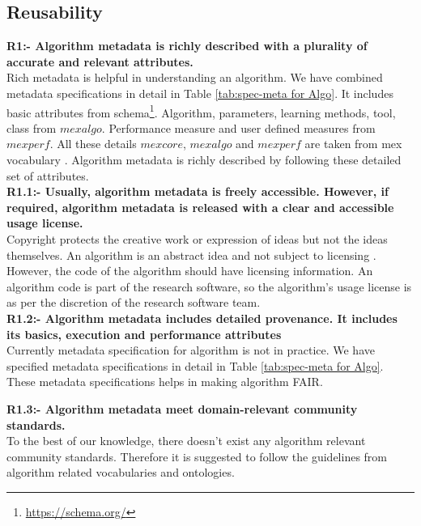 \documentclass[preprint,12pt]{elsarticle}
\begin{document}
\subsection{Reusability}
\textbf{R1:- Algorithm metadata is richly described with a plurality of accurate and relevant attributes.}\\
Rich metadata is helpful in understanding an algorithm. We have combined metadata specifications in detail in Table \ref{tab:spec-meta for Algo}. It includes basic attributes from schema\footnote{\url{https://schema.org/}}. Algorithm, parameters, learning methods, tool, class from $mexalgo$. Performance measure and user defined measures from $mexperf$. All these details $mexcore$, $mexalgo$ and $mexperf$ are taken from mex vocabulary \cite{esteves2015mex}. Algorithm metadata is richly described by following these detailed set of attributes.\\
\textbf{R1.1:- Usually, algorithm metadata is freely accessible. However, if required, algorithm metadata is released with a clear and accessible usage license.}\\
Copyright protects the creative work or expression of ideas but not the ideas themselves. An algorithm is an abstract idea and not subject to licensing \cite{cormen2009introduction}. However, the code of the algorithm should have licensing information. An algorithm code is part of the research software, so the algorithm's usage license is as per the discretion of the research software team.\\

\textbf{R1.2:- Algorithm metadata includes detailed provenance. It includes its basics, execution and performance attributes}\\
Currently metadata specification for algorithm is not in practice. We have specified metadata specifications in detail in Table \ref{tab:spec-meta for Algo}. These metadata specifications helps in making algorithm FAIR.

\textbf{R1.3:- Algorithm metadata meet domain-relevant community standards.}\\
To the best of our knowledge, there doesn't exist any algorithm relevant community standards. Therefore it is suggested to follow the guidelines from algorithm related vocabularies and ontologies.
\end{document}
